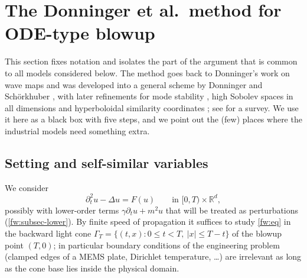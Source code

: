 \section{The Donninger et al.\ method for ODE-type blowup}
\label{fw:sec}

This section fixes notation and isolates the part of the argument that is
common to all models considered below. The method goes back to Donninger's
work on wave maps \cite{Donninger2011} and was developed into a general
scheme by Donninger and Schörkhuber
\cite{DonningerSchoerkhuber2012,DonningerSchoerkhuber2014,DonningerSchoerkhuber2016,DonningerSchoerkhuber2017},
with later refinements for mode stability \cite{CostinDonningerGlogic2017},
high Sobolev spaces in all dimensions \cite{Ostermann2024,Glogic2025} and
hyperboloidal similarity coordinates \cite{BiernatDonningerSchoerkhuber2021}; see \cite{Donninger2024} for a survey.
We use it here as a black box with five steps, and we point out the (few)
places where the industrial models need something extra.

\subsection{Setting and self-similar variables}
We consider
\begin{equation}\label{fw:eq}
  \partial_t^2 u-\Delta u = F(u) \qquad\text{in } [0,T)\times\mathbb R^d,
\end{equation}
possibly with lower-order terms $\gamma\partial_t u+m^2u$ that will be treated
as perturbations (\cref{fw:subsec-lower}). By finite speed of propagation it
suffices to study \eqref{fw:eq} in the backward light cone
$\Gamma_T=\{(t,x):0\le t<T,\ |x|\le T-t\}$ of the blowup point $(T,0)$; in
particular boundary conditions of the engineering problem (clamped edges of a
MEMS plate, Dirichlet temperature, \dots) are irrelevant as long as the cone
base lies inside the physical domain.

